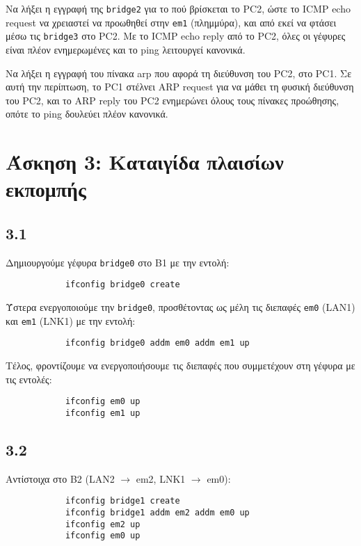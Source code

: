 \documentclass[a4paper, 12pt]{article}
\begin{document}
		Να λήξει η εγγραφή της \verb|bridge2| για το πού βρίσκεται το PC2, ώστε το ICMP echo request να χρειαστεί να προωθηθεί στην \verb|em1| (πλημμύρα), και από εκεί να φτάσει μέσω τις \verb|bridge3| στο PC2. Με το ICMP echo reply από το PC2, όλες οι γέφυρες είναι πλέον ενημερωμένες και το ping λειτουργεί κανονικά.
		
		Να λήξει η εγγραφή του πίνακα arp που αφορά τη διεύθυνση του PC2, στο PC1. Σε αυτή την περίπτωση, το PC1 στέλνει ARP request για να μάθει τη φυσική διεύθυνση του PC2, και το ARP reply του PC2 ενημερώνει όλους τους πίνακες προώθησης, οπότε το ping δουλεύει πλέον κανονικά. 

\section*{Άσκηση 3: Καταιγίδα πλαισίων εκπομπής} 

	\subsection*{3.1}
		Δημιουργούμε γέφυρα \verb|bridge0| στο B1 με την εντολή:
		
		\begin{verbatim}
			ifconfig bridge0 create
		\end{verbatim}
		
		Ύστερα ενεργοποιούμε την \verb|bridge0|, προσθέτοντας ως μέλη τις διεπαφές \verb|em0| (LAN1) και \verb|em1| (LNK1) με την εντολή:
		
		\begin{verbatim}
			ifconfig bridge0 addm em0 addm em1 up
		\end{verbatim}
		
		Τέλος, φροντίζουμε να ενεργοποιήσουμε τις διεπαφές που συμμετέχουν στη γέφυρα με τις εντολές:
		
		\begin{verbatim}
			ifconfig em0 up
			ifconfig em1 up
		\end{verbatim}

	\subsection*{3.2}
		Αντίστοιχα στο B2 (LAN2 $\rightarrow$ em2, LNK1 $\rightarrow$ em0):
		
		\begin{verbatim}
			ifconfig bridge1 create
			ifconfig bridge1 addm em2 addm em0 up
			ifconfig em2 up
			ifconfig em0 up
		\end{verbatim}
		
\end{document}
